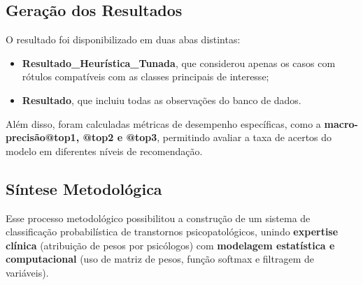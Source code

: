 \subsection{Geração dos Resultados}
O resultado foi disponibilizado em duas abas distintas:  
\begin{itemize}
    \item \textbf{Resultado\_Heurística\_Tunada}, que considerou apenas os casos com rótulos compatíveis com as classes principais de interesse;
    \item \textbf{Resultado}, que incluiu todas as observações do banco de dados.
\end{itemize}

Além disso, foram calculadas métricas de desempenho específicas, como a \textbf{macro-precisão@top1, @top2 e @top3}, permitindo avaliar a taxa de acertos do modelo em diferentes níveis de recomendação.

\subsection{Síntese Metodológica}
Esse processo metodológico possibilitou a construção de um sistema de classificação probabilística de transtornos psicopatológicos, unindo \textbf{expertise clínica} (atribuição de pesos por psicólogos) com \textbf{modelagem estatística e computacional} (uso de matriz de pesos, função softmax e filtragem de variáveis).
